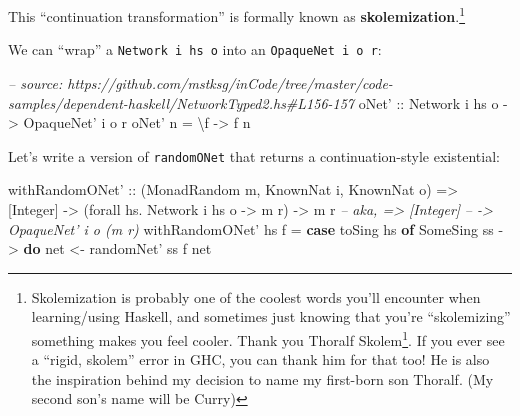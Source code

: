 \documentclass[]{article}
\newenvironment{Shaded}{}{}
\newcommand{\KeywordTok}[1]{\textcolor[rgb]{0.00,0.44,0.13}{\textbf{{#1}}}}
\newcommand{\DataTypeTok}[1]{\textcolor[rgb]{0.56,0.13,0.00}{{#1}}}
\newcommand{\CommentTok}[1]{\textcolor[rgb]{0.38,0.63,0.69}{\textit{{#1}}}}
\newcommand{\OtherTok}[1]{\textcolor[rgb]{0.00,0.44,0.13}{{#1}}}
\newcommand{\FunctionTok}[1]{\textcolor[rgb]{0.02,0.16,0.49}{{#1}}}
\newcommand{\NormalTok}[1]{{#1}}
\renewcommand{\href}[2]{#2\footnote{\url{#1}}}
\begin{document}
This ``continuation transformation'' is formally known as
\textbf{skolemization}.\footnote{Skolemization is probably one of the coolest
  words you'll encounter when learning/using Haskell, and sometimes just knowing
  that you're ``skolemizing'' something makes you feel cooler. Thank you
  \href{https://en.wikipedia.org/wiki/Thoralf_Skolem}{Thoralf Skolem}. If you
  ever see a ``rigid, skolem'' error in GHC, you can thank him for that too! He
  is also the inspiration behind my decision to name my first-born son Thoralf.
  (My second son's name will be Curry)}

We can ``wrap'' a \texttt{Network\ i\ hs\ o} into an
\texttt{OpaqueNet\textquotesingle{}\ i\ o\ r}:

\begin{Shaded}
\begin{Highlighting}[]
\CommentTok{-- source: https://github.com/mstksg/inCode/tree/master/code-samples/dependent-haskell/NetworkTyped2.hs#L156-157}
\OtherTok{oNet' ::} \DataTypeTok{Network} \NormalTok{i hs o }\OtherTok{->} \DataTypeTok{OpaqueNet'} \NormalTok{i o r}
\NormalTok{oNet' n }\FunctionTok{=} \NormalTok{\textbackslash{}f }\OtherTok{->} \NormalTok{f n}
\end{Highlighting}
\end{Shaded}

Let's write a version of \texttt{randomONet} that returns a continuation-style
existential:

\begin{Shaded}
\begin{Highlighting}[]
\OtherTok{withRandomONet' ::} \NormalTok{(}\DataTypeTok{MonadRandom} \NormalTok{m, }\DataTypeTok{KnownNat} \NormalTok{i, }\DataTypeTok{KnownNat} \NormalTok{o)}
                \OtherTok{=>} \NormalTok{[}\DataTypeTok{Integer}\NormalTok{]}
                \OtherTok{->} \NormalTok{(forall hs}\FunctionTok{.} \DataTypeTok{Network} \NormalTok{i hs o }\OtherTok{->} \NormalTok{m r)}
                \OtherTok{->} \NormalTok{m r}
\CommentTok{--         aka, => [Integer]}
\CommentTok{--              -> OpaqueNet' i o (m r)}
\NormalTok{withRandomONet' hs f }\FunctionTok{=} \KeywordTok{case} \NormalTok{toSing hs }\KeywordTok{of}
                         \DataTypeTok{SomeSing} \NormalTok{ss }\OtherTok{->} \KeywordTok{do}
                           \NormalTok{net }\OtherTok{<-} \NormalTok{randomNet' ss}
                           \NormalTok{f net}
\end{Highlighting}
\end{Shaded}
\end{document}
